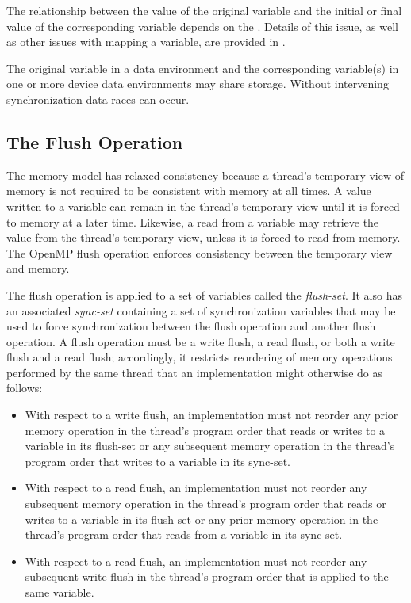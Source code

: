 The relationship between the value of the original variable and the initial or final value
of the corresponding variable depends on the . Details of this issue, as well as
other issues with mapping a variable, are provided in .

The original variable in a data environment and the corresponding variable(s) in one or
more device data environments may share storage. Without intervening synchronization  
data races can occur.




\subsection{The Flush Operation}
\label{subsec:The Flush Operation}

The memory model has relaxed-consistency because a thread’s temporary view of
memory is not required to be consistent with memory at all times. A value written to a
variable can remain in the thread’s temporary view until it is forced to memory at a later
time. Likewise, a read from a variable may retrieve the value from the thread’s
temporary view, unless it is forced to read from memory. The OpenMP flush operation
enforces consistency between the temporary view and memory.

The flush operation is applied to a set of variables called the
\emph{flush-set}. It also has an associated \emph{sync-set}
containing a set of synchronization variables that may be used to force
synchronization between the flush operation and another flush operation.  A flush operation
must be a write flush, a read flush, or both a write flush and a
read flush; accordingly, it restricts reordering of memory operations
performed by the same thread that an implementation might otherwise do as
follows:

\begin{itemize}
\item With respect to a write flush, an implementation must not reorder any
    prior memory operation in the thread's program order that reads or writes
    to a variable in its flush-set or any subsequent memory operation in the
    thread's program order that writes to a variable in its sync-set.

\item With respect to a read flush, an implementation must not reorder any
    subsequent memory operation in the thread's program order that reads or
    writes to a variable in its flush-set or any prior memory operation in the
    thread's program order that reads from a variable in its sync-set.

\item With respect to a read flush, an implementation must not reorder any
    subsequent write flush in the thread's program order that is applied to
    the same variable.
\end{itemize}

